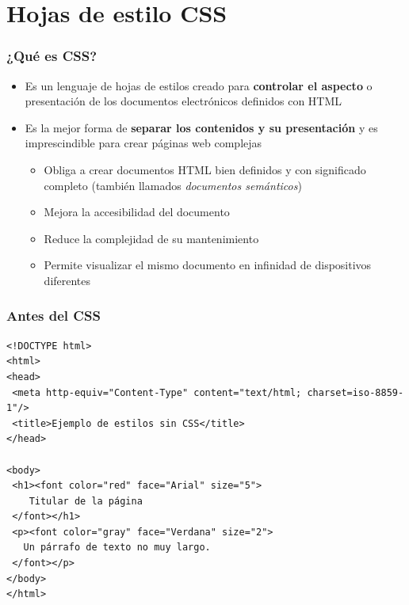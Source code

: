 %

\section{Hojas de estilo CSS}



\begin{frame}
\frametitle{¿Qué es CSS?}

\begin{itemize}
  \item Es un lenguaje de hojas de estilos creado para {\bf controlar el aspecto} o presentación de los documentos electrónicos definidos con HTML
  \item Es la mejor forma de {\bf separar los contenidos y su presentación} y es imprescindible para crear páginas web complejas
  \begin{itemize}
    \item Obliga a crear documentos HTML bien definidos y con significado completo (también llamados \emph{documentos semánticos})
    \item Mejora la accesibilidad del documento
    \item Reduce la complejidad de su mantenimiento
    \item Permite visualizar el mismo documento en infinidad de dispositivos diferentes
  \end{itemize}
\end{itemize}

\end{frame}


\begin{frame}[fragile]
\frametitle{Antes del CSS}

{\footnotesize
\begin{verbatim}
<!DOCTYPE html>
<html>
<head>
 <meta http-equiv="Content-Type" content="text/html; charset=iso-8859-1"/>
 <title>Ejemplo de estilos sin CSS</title>
</head>
 
<body>
 <h1><font color="red" face="Arial" size="5">
    Titular de la página
 </font></h1>
 <p><font color="gray" face="Verdana" size="2">
   Un párrafo de texto no muy largo.
 </font></p>
</body>
</html>
\end{verbatim}
}

\end{frame}

